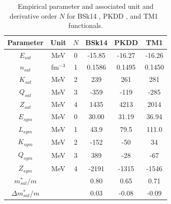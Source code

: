 \begin{table}[!t]
\begin{center}
\begin{tabular}{cccccc} 
  \toprule
  \toprule
  Parameter & Unit & $N$ & BSk14 & PKDD & TM1\\
  \midrule
  $E_{sat}$ & MeV & 0         & -15.85 & -16.27  & -16.26 \\
  $n_{sat}$ & fm$^{-3}$ & 1   & 0.1586 &  0.1495 & 0.1450 \\ 
  $K_{sat}$ & MeV & 2         & 239    &  261    & 281    \\ 
  $Q_{sat}$ & MeV & 3         & -359   &  -119   & -285   \\ 
  $Z_{sat}$ & MeV & 4         & 1435   &  4213   & 2014   \\ 
  $E_{sym}$ & MeV & 0         & 30.00  &  31.19  & 36.94  \\
  $L_{sym}$ & MeV & 1         & 43.9   &  79.5   & 111.0  \\
  $K_{sym}$ & MeV & 2         & -152   &  -50    & 34     \\
  $Q_{sym}$ & MeV & 3         & 389    &  -28    & -67    \\
  $Z_{sym}$ & MeV & 4         & -2191  &  -1315  & -1546  \\
  $m_{sat}^*/m$ & &           & 0.80   &  0.65   & 0.71   \\
  $\Delta m_{sat}^*/m$ & &    & 0.03   &  -0.08  & -0.09  \\
  \bottomrule
  \bottomrule
\end{tabular}
\end{center}
\caption[Empirical parameters for BSk14, PKDD, and TM1]{Empirical parameter and 
  associated unit and derivative order $N$ for BSk14 \cite{Goriely2007}, PKDD
  \cite{Long2004}, and TM1~\cite{Sumiyoshi1995} 
functionals.}\label{table:newemppar}
\end{table}

